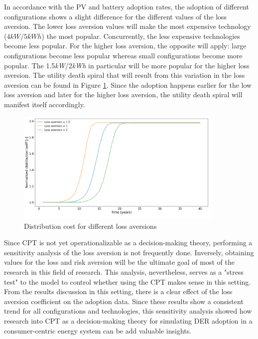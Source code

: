 \noindent
In accordance with the PV and battery adoption rates, the adoption of different configurations shows a slight difference for the different values of the loss aversion. The lower loss aversion values will make the most expensive technology ($4kW/5kWh$) the most popular. Concurrently, the less expensive technologies become less popular. For the higher loss aversion, the opposite will apply: large configurations become less popular whereas small configurations become more popular. The 1.5\textit{kW}/2\textit{kWh} in particular will be more popular for the higher loss aversion. 
\newline \newline \noindent
The utility death spiral that will result from this variation in the loss aversion can be found in Figure \ref{Figure:distlossvol}. Since the adoption happens earlier for the low loss aversion and later for the higher loss aversion, the utility death spiral will manifest itself accordingly.  
\begin{figure}[h!]
\centering
\includegraphics[width=10cm]{ModelAnalysis/Dist.png}
\caption{Distribution cost for different loss aversions}
\label{Figure:distlossvol}
\end{figure}
\noindent
Since CPT is not yet operationalizable as a decision-making theory, performing a sensitivity analysis of the loss aversion is not frequently done. Inversely, obtaining values for the loss and risk aversion will be the ultimate goal of most of the research in this field of research. This analysis, nevertheless, serves as a "stress test" to the model to control whether using the CPT makes sense in this setting. From the results discussion in this setting, there is a clear effect of the loss aversion coefficient on the adoption data. Since these results show a consistent trend for all configurations and technologies, this sensitivity analysis showed how research into CPT as a decision-making theory for simulating DER adoption in a consumer-centric energy system can be add valuable insights. 
